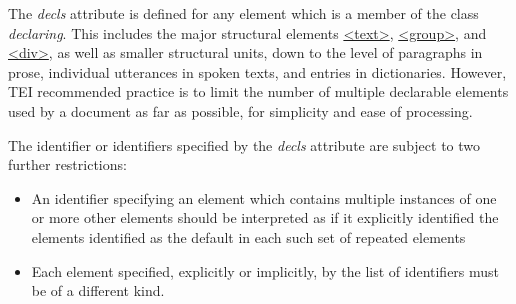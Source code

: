 The {\itshape decls} attribute is defined for any element which is a member of the class \textit{declaring}. This includes the major structural elements \hyperref[TEI.text]{<text>}, \hyperref[TEI.group]{<group>}, and \hyperref[TEI.div]{<div>}, as well as smaller structural units, down to the level of paragraphs in prose, individual utterances in spoken texts, and entries in dictionaries. However, TEI recommended practice is to limit the number of multiple declarable elements used by a document as far as possible, for simplicity and ease of processing.\par
The identifier or identifiers specified by the {\itshape decls} attribute are subject to two further restrictions: \begin{itemize}
\item An identifier specifying an element which contains multiple instances of one or more other elements should be interpreted as if it explicitly identified the elements identified as the default in each such set of repeated elements
\item Each element specified, explicitly or implicitly, by the list of identifiers must be of a different kind.
\end{itemize} \par
